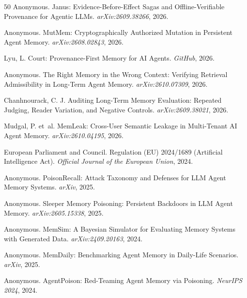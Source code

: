 \documentclass{article}
\begin{document}
\begin{thebibliography}{50}
Anonymous.
\newblock Janus: Evidence-Before-Effect Sagas and Offline-Verifiable Provenance for Agentic LLMs.
\newblock \emph{arXiv:2609.38266}, 2026.

Anonymous.
\newblock MutMem: Cryptographically Authorized Mutation in Persistent Agent Memory.
\newblock \emph{arXiv:2608.02843}, 2026.

Lyu, L.
\newblock Court: Provenance-First Memory for AI Agents.
\newblock \emph{GitHub}, 2026.

Anonymous.
\newblock The Right Memory in the Wrong Context: Verifying Retrieval Admissibility in Long-Term Agent Memory.
\newblock \emph{arXiv:2610.07309}, 2026.

Chanhnourack, C. J.
\newblock Auditing Long-Term Memory Evaluation: Repeated Judging, Reader Variation, and Negative Controls.
\newblock \emph{arXiv:2609.38021}, 2026.

Mudgal, P. et~al.
\newblock MemLeak: Cross-User Semantic Leakage in Multi-Tenant AI Agent Memory.
\newblock \emph{arXiv:2610.04195}, 2026.

European Parliament and Council.
\newblock Regulation (EU) 2024/1689 (Artificial Intelligence Act).
\newblock \emph{Official Journal of the European Union}, 2024.


Anonymous.
\newblock PoisonRecall: Attack Taxonomy and Defenses for LLM Agent Memory Systems.
\newblock \emph{arXiv}, 2025.

Anonymous.
\newblock Sleeper Memory Poisoning: Persistent Backdoors in LLM Agent Memory.
\newblock \emph{arXiv:2605.15338}, 2025.

Anonymous.
\newblock MemSim: A Bayesian Simulator for Evaluating Memory Systems with Generated Data.
\newblock \emph{arXiv:2409.20163}, 2024.

Anonymous.
\newblock MemDaily: Benchmarking Agent Memory in Daily-Life Scenarios.
\newblock \emph{arXiv}, 2025.

Anonymous.
\newblock AgentPoison: Red-Teaming Agent Memory via Poisoning.
\newblock \emph{NeurIPS 2024}, 2024.

\end{thebibliography}
\end{document}
